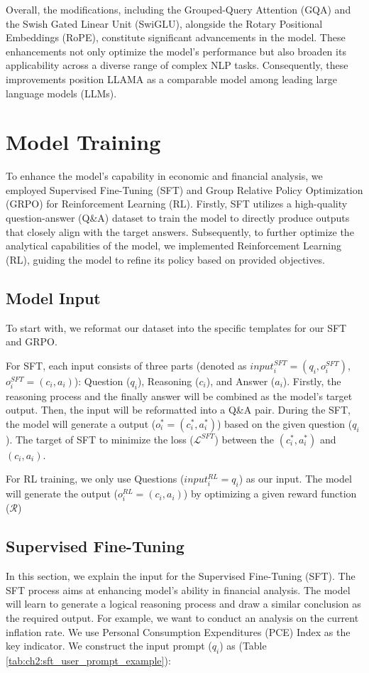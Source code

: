 Overall, the modifications, including the Grouped-Query Attention (GQA) and the Swish Gated Linear Unit (SwiGLU), alongside the Rotary Positional Embeddings (RoPE), constitute significant advancements in the model. These enhancements not only optimize the model's performance but also broaden its applicability across a diverse range of complex NLP tasks. Consequently, these improvements position LLAMA as a comparable model among leading large language models (LLMs).




\section{Model Training}

To enhance the model's capability in economic and financial analysis, we employed Supervised Fine-Tuning (SFT) and Group Relative Policy Optimization (GRPO) for Reinforcement Learning (RL). Firstly, SFT utilizes a high-quality question-answer (Q\&A) dataset to train the model to directly produce outputs that closely align with the target answers. Subsequently, to further optimize the analytical capabilities of the model, we implemented Reinforcement Learning (RL), guiding the model to refine its policy based on provided objectives.


\subsection{Model Input}
To start with, we reformat our dataset into the specific templates for our SFT and GRPO. 

For SFT, each input consists of three parts (denoted as $input^{SFT}_i = (q_i, o^{SFT}_i)$, $o^{SFT}_i = (c_i, a_i)$): Question ($q_i$), Reasoning ($c_i$), and Answer ($a_i$). Firstly, the reasoning process and the finally answer will be combined as the model's target output. Then, the input will be reformatted into a Q\&A pair. During the SFT, the model will generate a output ($o_i^* = (c^*_i, a^*_i)$) based on the given question ($q_i$). The target of SFT to minimize the loss ($\mathcal{L}^{SFT}$) between the $(c^*_i, a^*_i)$ and $(c_i, a_i)$.


For RL training, we only use Questions ($input^{RL}_i = q_i$) as our input. The model will generate the output ($o^{RL}_i = (c_i, a_i)$) by optimizing a given reward function ($\mathcal{R}$)


\subsection{Supervised Fine-Tuning}
In this section, we explain the input for the Supervised Fine-Tuning (SFT). The SFT process aims at enhancing model's ability in financial analysis. The model will learn to generate a logical reasoning process and draw a similar conclusion as the required output. For example, we want to conduct an analysis on the current inflation rate. We use Personal Consumption Expenditures (PCE) Index as the key indicator. We construct the input prompt ($q_i$) as (Table \ref{tab:ch2:sft_user_prompt_example}):


